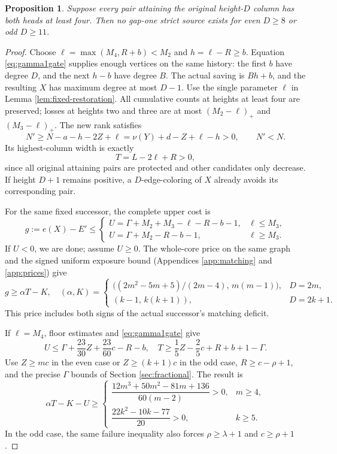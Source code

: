 \documentclass[11pt,a4paper]{article}
\newtheorem{proposition}[theorem]{Proposition}
\theoremstyle{definition}
\begin{document}
\begin{proposition}\label{prop:gamma1largeheads}
Suppose every pair attaining the original height-$D$ column has both heads at least four. Then no gap-one strict source exists for even $D\ge8$ or odd $D\ge11$.
\end{proposition}
\begin{proof}
Choose $\ell=\max(M_4,R+b)<M_2$ and $h=\ell-R\ge b$. Equation \eqref{eq:gamma1gate} supplies enough vertices on the same history: the first $b$ have degree $D$, and the next $h-b$ have degree $B$. The actual saving is $Bh+b$, and the resulting $X$ has maximum degree at most $D-1$.
Use the single parameter $\ell$ in Lemma \ref{lem:fixed-restoration}. All cumulative counts at heights at least four are preserved; losses at heights two and three are at most $(M_2-\ell)_+$ and $(M_3-\ell)_+$. The new rank satisfies
\[
N'\ge N-a-h-2Z+\ell=\nu(Y)+d-Z+\ell-h>0,\qquad N'<N.
\]
Its highest-column width is exactly
\begin{equation}\label{eq:topwidth}
T=L-2\ell+R>0,
\end{equation}
since all original attaining pairs are protected and other candidates only decrease. If height $D+1$ remains positive, a $D$-edge-coloring of $X$ already avoids its corresponding pair.

For the same fixed successor, the complete upper cost is
\[
g:=e(X)-E'\le
\begin{cases}
U=\Gamma+M_2+M_3-\ell-R-b-1,&\ell\le M_3,\\
U=\Gamma+M_2-R-b-1,&\ell\ge M_3.
\end{cases}
\]
If $U<0$, we are done; assume $U\ge0$. The whole-core price on the same graph and the signed uniform exposure bound (Appendices \ref{app:matching} and \ref{app:prices}) give
\begin{equation}\label{eq:topprice}
g\ge\alpha T-K,\quad
(\alpha,K)=
\begin{cases}
\bigl((2m^2-5m+5)/(2m-4),\,m(m-1)\bigr),&D=2m,\\
(k-1,\,k(k+1)),&D=2k+1.
\end{cases}
\end{equation}
This price includes both signs of the actual successor's matching deficit.

If $\ell=M_4$, floor estimates and \eqref{eq:gamma1gate} give
\[
U\le\Gamma+\frac{23}{30}Z+\frac{23}{60}c-R-b,\quad
T\ge\frac15Z-\frac25c+R+b+1-\Gamma.
\]
Use $Z\ge mc$ in the even case or $Z\ge(k+1)c$ in the odd case, $R\ge c-\rho+1$, and the precise $\Gamma$ bounds of Section \ref{sec:fractional}. The result is
\[
\alpha T-K-U\ge
\begin{cases}
\dfrac{12m^3+50m^2-81m+136}{60(m-2)}>0,&m\ge4,\\[4pt]
\dfrac{22k^2-10k-77}{20}>0,&k\ge5.
\end{cases}
\]
In the odd case, the same failure inequality also forces $\rho\ge\lambda+1$ and $c\ge\rho+1$.


\end{proof}
\end{document}
